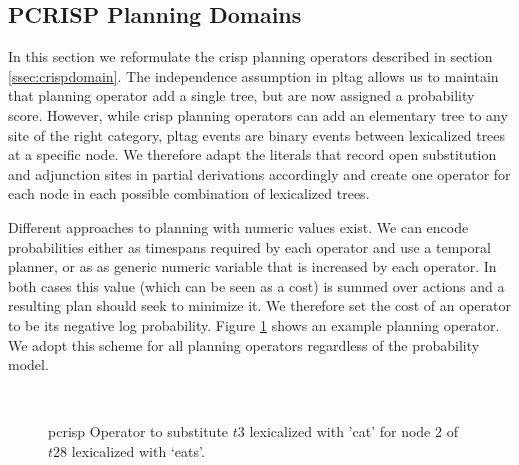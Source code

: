 \subsection{PCRISP Planning Domains}
\label{ssec:pcrisp-domains}
In this section we reformulate the {\sc crisp} planning operators described in section \ref{ssec:crispdomain}.
The independence assumption in {\sc pltag} allows us to maintain that planning operator add a single tree, but are now assigned a probability score. However, while {\sc crisp} planning operators can add an elementary tree to any site of the right category, {\sc pltag} events are binary events between lexicalized trees at a specific node. We therefore adapt the literals that record open substitution and adjunction sites in partial derivations accordingly and create one operator for each node in each possible combination of lexicalized trees.

Different approaches to planning with numeric values exist. We can encode probabilities either as timespans required by each operator and use a temporal planner, or as as generic numeric variable that is increased by each operator. In both cases this value (which can be seen as a cost) is summed over actions and a resulting plan should seek to minimize it. We therefore set the cost of an operator to be its negative log probability. 
Figure \ref{example-action} shows an example planning operator. We adopt this scheme for all planning operators regardless of the probability model.
\begin{figure}[t]
\begin{center}
\\\smallskip
\caption{\label{example-action} {\sc pcrisp} Operator to substitute $t3$ lexicalized with 'cat' for node 2 of $t28$ lexicalized with `eats'.}
\end{center}
\end{figure}





